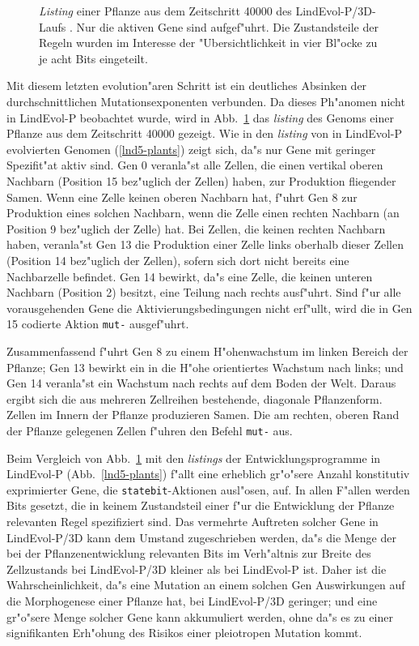 \begin{figure}[t]
\caption[\textsl{Listing} einer Pflanze aus LindEvol-P/3D]
{\label{lnd53d-listing}
\textsl{Listing} einer Pflanze aus dem Zeitschritt 40000 des LindEvol-P/3D-Laufs .
Nur die aktiven Gene sind aufgef"uhrt. Die Zustandsteile der
Regeln wurden im Interesse der "Ubersichtlichkeit in vier Bl"ocke zu je acht Bits eingeteilt.
}
\end{figure}

Mit diesem letzten evolution"aren Schritt ist ein deutliches Absinken der durchschnittlichen Mutationsexponenten
verbunden. Da dieses Ph"anomen nicht in LindEvol-P beobachtet wurde, wird in Abb.\ \ref{lnd53d-listing} das \textsl{listing}
des Genoms einer Pflanze aus dem Zeitschritt 40000 gezeigt. Wie in den \textsl{listing} von in LindEvol-P evolvierten
Genomen (\ref{lnd5-plants}) zeigt sich, da"s nur Gene mit geringer Spezifit"at aktiv sind. Gen 0 veranla"st alle Zellen,
die einen vertikal oberen Nachbarn (Position 15 bez"uglich der Zellen) haben, zur Produktion fliegender Samen.
Wenn eine Zelle keinen oberen Nachbarn hat,
f"uhrt Gen 8 zur Produktion eines solchen Nachbarn, wenn die Zelle einen rechten Nachbarn
(an Position 9 bez"uglich der Zelle) hat. Bei Zellen, die keinen
rechten Nachbarn haben, veranla"st Gen 13 die Produktion einer Zelle links oberhalb dieser Zellen (Position 14 bez"uglich der
Zellen), sofern sich dort nicht bereits eine Nachbarzelle befindet. Gen 14 bewirkt, da"s eine Zelle, die keinen unteren
Nachbarn (Position 2) besitzt, eine Teilung nach rechts ausf"uhrt. Sind f"ur alle vorausgehenden Gene die Aktivierungsbedingungen
nicht erf"ullt, wird die in Gen 15 codierte Aktion \verb|mut-| ausgef"uhrt.

Zusammenfassend f"uhrt Gen 8 zu einem H"ohenwachstum im linken Bereich der Pflanze; Gen 13 bewirkt ein in die H"ohe
orientiertes Wachstum nach links; und Gen 14 veranla"st ein Wachstum nach rechts auf dem Boden der Welt. Daraus ergibt
sich die aus mehreren Zellreihen bestehende, diagonale Pflanzenform. Zellen im Innern der Pflanze produzieren Samen.
Die am rechten, oberen Rand der Pflanze gelegenen Zellen f"uhren den Befehl \verb|mut-| aus.

\begin{sloppypar}
Beim Vergleich von Abb.\ \ref{lnd53d-listing} mit den \textsl{listings} der Entwicklungsprogramme in LindEvol-P
(Abb.\ \ref{lnd5-plants}) f"allt eine erheblich gr"o"sere Anzahl konstitutiv exprimierter Gene, die \verb|statebit|-Aktionen ausl"osen,
auf. In allen F"allen werden Bits gesetzt, die in keinem Zustandsteil einer f"ur die Entwicklung der Pflanze
relevanten Regel spezifiziert sind. Das vermehrte Auftreten solcher Gene in LindEvol-P/3D kann dem Umstand
zugeschrieben werden, da"s die Menge der bei der Pflanzenentwicklung relevanten Bits im Verh"altnis zur Breite
des Zellzustands bei LindEvol-P/3D kleiner als bei LindEvol-P ist. Daher ist die Wahrscheinlichkeit, da"s eine
Mutation an einem solchen Gen Auswirkungen auf die Morphogenese einer Pflanze hat, bei LindEvol-P/3D geringer;
und eine gr"o"sere Menge solcher Gene kann akkumuliert werden, ohne da"s es zu einer signifikanten Erh"ohung
des Risikos einer pleiotropen Mutation kommt.
\end{sloppypar}


